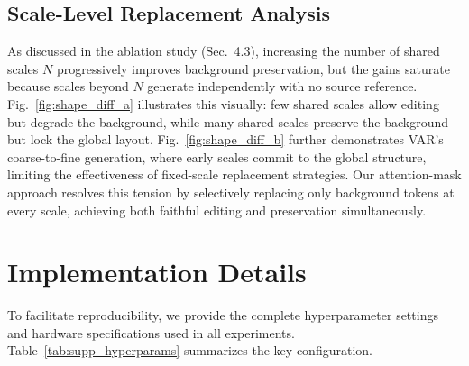 

\subsection{Scale-Level Replacement Analysis}
\label{sec:supp_shape_diff}



As discussed in the ablation study (Sec.~4.3), increasing the number of shared scales $N$ progressively improves background preservation, but the gains saturate because scales beyond $N$ generate independently with no source reference. Fig.~\ref{fig:shape_diff_a} illustrates this visually: few shared scales allow editing but degrade the background, while many shared scales preserve the background but lock the global layout. Fig.~\ref{fig:shape_diff_b} further demonstrates VAR's coarse-to-fine generation, where early scales commit to the global structure, limiting the effectiveness of fixed-scale replacement strategies. Our attention-mask approach resolves this tension by selectively replacing only background tokens at every scale, achieving both faithful editing and preservation simultaneously.

\section{Implementation Details}
\label{sec:supp_impl}

To facilitate reproducibility, we provide the complete hyperparameter settings and hardware specifications used in all experiments. Table~\ref{tab:supp_hyperparams} summarizes the key configuration.

